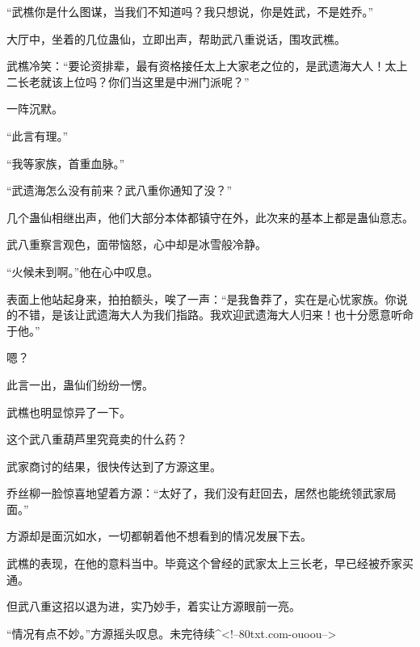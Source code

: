\begin{this_body}
“武樵你是什么图谋，当我们不知道吗？我只想说，你是姓武，不是姓乔。”

大厅中，坐着的几位蛊仙，立即出声，帮助武八重说话，围攻武樵。

武樵冷笑：“要论资排辈，最有资格接任太上大家老之位的，是武遗海大人！太上二长老就该上位吗？你们当这里是中洲门派呢？”

一阵沉默。

“此言有理。”

“我等家族，首重血脉。”

“武遗海怎么没有前来？武八重你通知了没？”

几个蛊仙相继出声，他们大部分本体都镇守在外，此次来的基本上都是蛊仙意志。

武八重察言观色，面带恼怒，心中却是冰雪般冷静。

“火候未到啊。”他在心中叹息。

表面上他站起身来，拍拍额头，唉了一声：“是我鲁莽了，实在是心忧家族。你说的不错，是该让武遗海大人为我们指路。我欢迎武遗海大人归来！也十分愿意听命于他。”

嗯？

此言一出，蛊仙们纷纷一愣。

武樵也明显惊异了一下。

这个武八重葫芦里究竟卖的什么药？

武家商讨的结果，很快传达到了方源这里。

乔丝柳一脸惊喜地望着方源：“太好了，我们没有赶回去，居然也能统领武家局面。”

方源却是面沉如水，一切都朝着他不想看到的情况发展下去。

武樵的表现，在他的意料当中。毕竟这个曾经的武家太上三长老，早已经被乔家买通。

但武八重这招以退为进，实乃妙手，着实让方源眼前一亮。

“情况有点不妙。”方源摇头叹息。未完待续\^{}<!--80txt.com-ouoou-->

\end{this_body}

